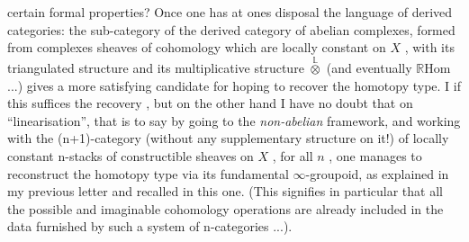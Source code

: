 
certain formal properties?\hand{)} Once one has at ones disposal the language of
derived categories: the sub-category of the derived category of abelian
complexes, formed from complexes  sheaves of cohomology which are locally
constant on $X$ , with its triangulated structure and its multiplicative
structure $\overset{\mathbb{L}}{\otimes}$ (and eventually $\mathbb{R}\mathrm{Hom}$ ...) gives a more satisfying candidate
for hoping to recover the homotopy type. I  if this suffices
  the recovery , but on the other hand I have no doubt
that on  ``linearisation'', that is to say by
going to the \emph{non-abelian} framework, and working with the (n+1)-category
(without any supplementary structure on it!) of locally constant n-stacks
of constructible sheaves on $X$ , for all $n$ , one manages to reconstruct
the homotopy type via its fundamental $\infty$-groupoid, as explained in my previous
letter and recalled in this one. (This signifies in particular that all
the possible and imaginable cohomology operations are already included in
the data furnished by such a system of n-categories ...).

